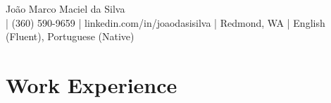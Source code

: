 \documentclass[letterpaper,11pt]{article}
\begin{document}
\begin{center}
  {\Large João Marco Maciel da Silva}\\[5pt]
  {\small \EMAIL{} | (360) 590-9659 | linkedin.com/in/joaodasisilva | Redmond, WA | English (Fluent), Portuguese (Native)}\\[5pt]
\end{center}


\section{Work Experience}









\end{document}

